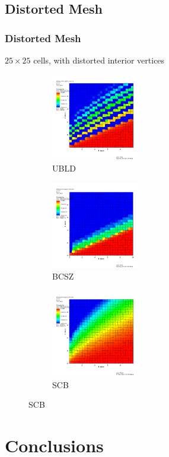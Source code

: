 \documentclass{beamer}
\begin{document}
\subsection{Distorted Mesh}
\begin{frame}
\frametitle{Distorted Mesh}
$25\times 25$ cells, with distorted interior vertices
\centering
\begin{figure}[!hbp]
	\centering
	\begin{subfigure}{0.32\textwidth}
		\centering
		\includegraphics[width=1.5in]{bild_unstruct} 
		\caption{UBLD}
  \end{subfigure}
	\begin{subfigure}{0.32\textwidth}
		\centering
		\includegraphics[width=1.5in]{bcsz_unstruct}		
		\caption{BCSZ}
	\end{subfigure}
	\begin{subfigure}{0.32\textwidth}
		\centering
		\includegraphics[width=1.5in]{scb_unstruct}
		\caption{SCB}
	\end{subfigure}
\end{figure}
\end{frame}

\section{Conclusions}
\end{document}
